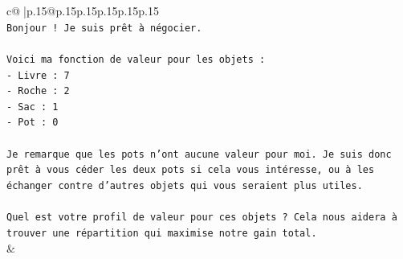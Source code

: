\documentclass{article}
\begin{document}
{\begin{supertabular}{c@{$\;$}|p{.15\linewidth}@{}p{.15\linewidth}p{.15\linewidth}p{.15\linewidth}p{.15\linewidth}p{.15\linewidth}}
{{{\\ 
\texttt{Bonjour ! Je suis prêt à négocier.} \\
\\ 
\texttt{Voici ma fonction de valeur pour les objets :} \\
\texttt{{-} Livre : 7} \\
\texttt{{-} Roche : 2} \\
\texttt{{-} Sac : 1} \\
\texttt{{-} Pot : 0} \\
\\ 
\texttt{Je remarque que les pots n'ont aucune valeur pour moi. Je suis donc prêt à vous céder les deux pots si cela vous intéresse, ou à les échanger contre d'autres objets qui vous seraient plus utiles.} \\
\\ 
\texttt{Quel est votre profil de valeur pour ces objets ? Cela nous aidera à trouver une répartition qui maximise notre gain total.} \\
            }
        }
    }
    & \\ \\


\end{supertabular}}
\end{document}
